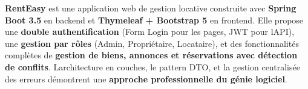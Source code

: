 \documentclass[12pt,a4paper]{article}
\begin{document}
\vfill

\begin{tcolorbox}[colback=resuccess!5, colframe=resuccess!40,
  title=\textbf{Prêt pour la Soutenance — Résumé en 30 secondes}, fonttitle=\bfseries]
\centering
\textbf{RentEasy} est une application web de gestion locative construite avec \textbf{Spring Boot 3.5} en backend et \textbf{Thymeleaf + Bootstrap 5} en frontend. Elle propose une \textbf{double authentification} (Form Login pour les pages, JWT pour l\textquotesingle API), une \textbf{gestion par rôles} (Admin, Propriétaire, Locataire), et des fonctionnalités complètes de \textbf{gestion de biens, annonces et réservations avec détection de conflits}. L\textquotesingle architecture en couches, le pattern DTO, et la gestion centralisée des erreurs démontrent une \textbf{approche professionnelle du génie logiciel}.
\end{tcolorbox}
\end{document}
